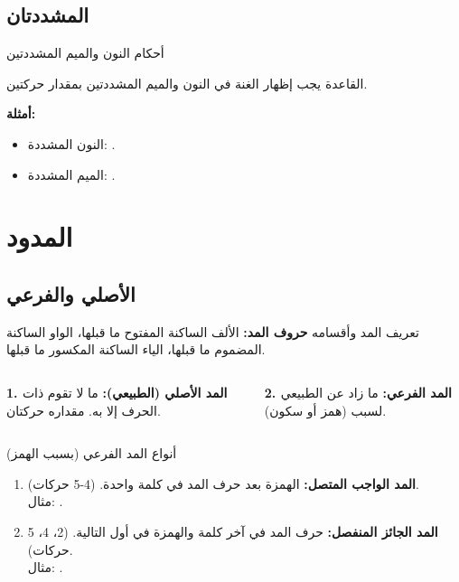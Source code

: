 \documentclass[aspectratio=169, 12pt]{beamer}
\begin{document}
\subsection{المشددتان}
\begin{frame}{أحكام النون والميم المشددتين}
    \begin{block}{القاعدة}
        يجب إظهار الغنة في النون والميم المشددتين بمقدار حركتين.
    \end{block}
    \textbf{أمثلة:}
    \begin{itemize}
        \item النون المشددة: .
        \item الميم المشددة: .
    \end{itemize}
\end{frame}

\section{المدود}
\subsection{الأصلي والفرعي}

\begin{frame}{تعريف المد وأقسامه}
    \textbf{حروف المد:} الألف الساكنة المفتوح ما قبلها، الواو الساكنة المضموم ما قبلها، الياء الساكنة المكسور ما قبلها.

    \begin{columns}
        \textbf{1. المد الأصلي (الطبيعي):}
        ما لا تقوم ذات الحرف إلا به. مقداره حركتان.

        \textbf{2. المد الفرعي:}
        ما زاد عن الطبيعي لسبب (همز أو سكون).
    \end{columns}
\end{frame}

\begin{frame}{أنواع المد الفرعي (بسبب الهمز)}
    \begin{enumerate}
        \item \textbf{المد الواجب المتصل:} الهمزة بعد حرف المد في كلمة واحدة. (4-5 حركات).
        \\ مثال: .
        \item \textbf{المد الجائز المنفصل:} حرف المد في آخر كلمة والهمزة في أول التالية. (2، 4، 5 حركات).
        \\ مثال: .
    \end{enumerate}
\end{frame}
\end{document}
